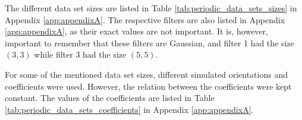 The different data set sizes are listed in Table \ref{tab:periodic_data_sets_sizes} in Appendix \ref{app:appendixA}.
The respective filters are also listed in Appendix \ref{app:appendixA}, as their exact values are not important.
It is, however, important to remember that these filters are Gaussian, and filter 1 had the size $(3,3)$ while filter 3 had the size $(5,5)$. %

For some of the mentioned data set sizes, different simulated orientations and coefficients were used.
However, the relation between the coefficients were kept constant.
The values of the coefficients are listed in Table \ref{tab:periodic_data_sets_coefficients} in Appendix \ref{app:appendixA}.




